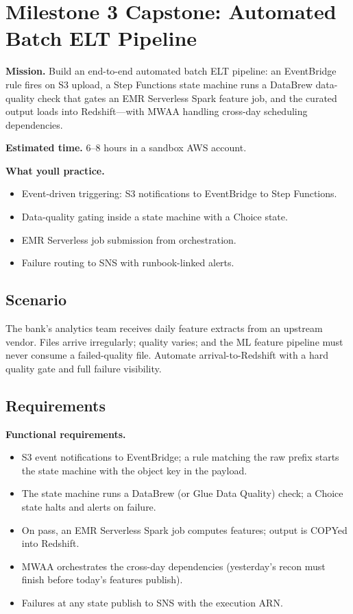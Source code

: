 \section{Milestone 3 Capstone: Automated Batch ELT Pipeline}\label{sec:ch12-capstone}

\begin{capstonebox}
\textbf{Mission.} Build an end-to-end automated batch ELT pipeline: an EventBridge rule fires on S3 upload, a Step Functions state machine runs a DataBrew data-quality check that gates an EMR Serverless Spark feature job, and the curated output loads into Redshift---with MWAA handling cross-day scheduling dependencies.

\textbf{Estimated time.} 6--8 hours in a sandbox AWS account.

\textbf{What you\textquotesingle{}ll practice.}
\begin{itemize}
    \item Event-driven triggering: S3 notifications to EventBridge to Step Functions.
    \item Data-quality gating inside a state machine with a Choice state.
    \item EMR Serverless job submission from orchestration.
    \item Failure routing to SNS with runbook-linked alerts.
\end{itemize}
\end{capstonebox}

\subsection*{Scenario}
The bank's analytics team receives daily feature extracts from an upstream vendor. Files arrive irregularly; quality varies; and the ML feature pipeline must never consume a failed-quality file. Automate arrival-to-Redshift with a hard quality gate and full failure visibility.

\subsection*{Requirements}
\textbf{Functional requirements.}
\begin{itemize}
    \item S3 event notifications to EventBridge; a rule matching the raw prefix starts the state machine with the object key in the payload.
    \item The state machine runs a DataBrew (or Glue Data Quality) check; a Choice state halts and alerts on failure.
    \item On pass, an EMR Serverless Spark job computes features; output is COPYed into Redshift.
    \item MWAA orchestrates the cross-day dependencies (yesterday's recon must finish before today's features publish).
    \item Failures at any state publish to SNS with the execution ARN.
\end{itemize}

